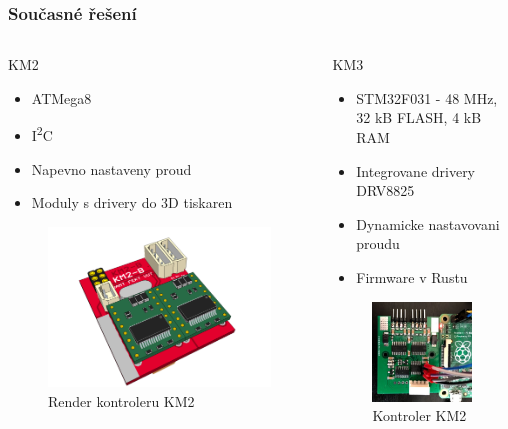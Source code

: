 \documentclass[%
  12pt,       				%
	t,                  %
	aspectratio=1610,   %
	unicode,						%
]{beamer}				    	%
\begin{document}
\begin{frame}
	\frametitle{Současné řešení}
	\begin{columns}[T] 								%
		\begin{column}{0.5\textwidth}
			KM2
			\begin{itemize}
				\item ATMega8
				\item I\textsuperscript{2}C
				\item Napevno nastaveny proud
				\item Moduly s drivery do 3D tiskaren
			\end{itemize}
			\begin{figure}%
				\centering
				\vspace{0.2cm}	              %
				\includegraphics[width=0.5\columnwidth]{../Thesis/obrazky/km2render}
				\caption{Render kontroleru KM2}
				\label{fig:km2}
			\end{figure}
		\end{column}
		\begin{column}{0.5\textwidth}
			KM3
				\begin{itemize}
					\item STM32F031 - 48 MHz, 32 kB FLASH, 4 kB RAM
					\item Integrovane drivery DRV8825
					\item Dynamicke nastavovani proudu
					\item Firmware v Rustu
				\end{itemize}
				\begin{figure}%
					\centering
					\vspace{0.1cm}	              %
					\includegraphics[width=0.4\columnwidth]{../Thesis/obrazky/km3}
					\caption{Kontroler KM2}
					\label{fig:km3}
				\end{figure}
		\end{column}
	\end{columns}											%
\end{frame}
\end{document}
